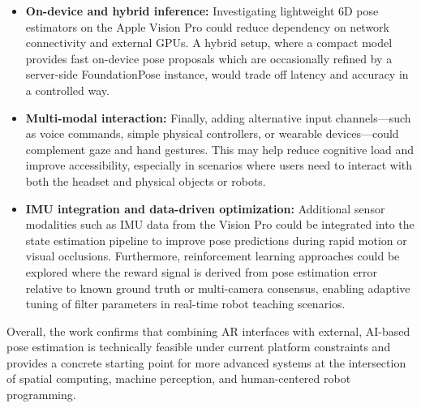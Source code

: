 \begin{itemize}
    \item \textbf{On-device and hybrid inference:}  
    Investigating lightweight 6D pose estimators on the Apple Vision Pro could reduce dependency on network connectivity and external GPUs. A hybrid setup, where a compact model provides fast on-device pose proposals which are occasionally refined by a server-side FoundationPose instance, would trade off latency and accuracy in a controlled way.

    \item \textbf{Multi-modal interaction:}
    Finally, adding alternative input channels—such as voice commands, simple physical controllers, or wearable devices—could complement gaze and hand gestures. This may help reduce cognitive load and improve accessibility, especially in scenarios where users need to interact with both the headset and physical objects or robots.

    \item \textbf{IMU integration and data-driven optimization:}
    Additional sensor modalities such as IMU data from the Vision Pro could be integrated into the state estimation pipeline to improve pose predictions during rapid motion or visual occlusions. Furthermore, reinforcement learning approaches could be explored where the reward signal is derived from pose estimation error relative to known ground truth or multi-camera consensus, enabling adaptive tuning of filter parameters in real-time robot teaching scenarios.
\end{itemize}

Overall, the work confirms that combining AR interfaces with external, AI-based pose estimation is technically feasible under current platform constraints and provides a concrete starting point for more advanced systems at the intersection of spatial computing, machine perception, and human-centered robot programming.